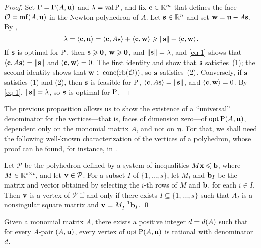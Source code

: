 \documentclass{amsart}
\begin{document}
\begin{proof}
   Set $\mathrm{P} = \mathrm{P}(A, \mathbf{u})$ and $\lambda = \operatorname{val} \mathrm{P} $, and fix $\mathbf{c} \in \mathbb{R}^m$ that defines the face $\mathcal{O} = \operatorname{mf}(A, \mathbf{u})$ in the Newton polyhedron of $A$.
   Let $\mathbf{s} \in \mathbb{R}^n$ and set $\mathbf{w} = \mathbf{u} - A\mathbf{s}$.
   By ,
   \begin{equation}\label{eq 1}
      \lambda = \langle \mathbf{c}, \mathbf{u} \rangle = \langle \mathbf{c}, A \mathbf{s} \rangle + \langle \mathbf{c}, \mathbf{w} \rangle \geqslant \| \mathbf{s} \| + \langle \mathbf{c}, \mathbf{w} \rangle.
   \end{equation}
   If $\mathbf{s}$ is optimal for $\mathrm{P}$, then $\mathbf{s} \geqslant \mathbf{0}$, $\mathbf{w} \geqslant \mathbf{0}$, and $\| \mathbf{s} \| = \lambda$, and \eqref{eq 1} shows that $\langle \mathbf{c}, A \mathbf{s} \rangle = \| \mathbf{s} \|$ and $\langle \mathbf{c}, \mathbf{w} \rangle = 0$.
   The first identity and  show that $\mathbf{s}$ satisfies~(1); the second identity shows that $\mathbf{w}\in \operatorname{cone}(\operatorname{rb}(\mathcal{O}))$, so $\mathbf{s}$ satisfies~(2).
   Conversely, if $\mathbf{s}$ satisfies (1) and (2), then $\mathbf{s}$ is feasible for $\mathrm{P}$, $\langle \mathbf{c}, A \mathbf{s} \rangle = \| \mathbf{s} \|$, and $\langle \mathbf{c}, \mathbf{w} \rangle = 0$.
   By \eqref{eq 1}, $\| \mathbf{s} \| = \lambda$, so $\mathbf{s}$ is optimal for $\mathrm{P}$.
\end{proof}

The previous proposition allows us to show the existence of a ``universal'' denominator for the vertices---that is, faces of dimension zero---of $\operatorname{opt}\mathrm{P}(A,\mathbf{u})$, dependent only on the monomial matrix $A$, and not on $\mathbf{u}$.
For that, we shall need the following well-known characterization of the vertices of a polyhedron, whose proof can be found, for instance, in \cite[Theorem~3.34]{conforti+etal.integer_programming}.

\begin{lemma}
   \label{prop: characterization of vertices}
   Let $\mathcal{P}$ be the polyhedron defined by a system of inequalities $M \mathbf{x} \leqslant \mathbf{b}$, where $M\in \mathbb{R}^{s\times t}$, and let $\mathbf{v} \in \mathcal{P}$.
   For a subset $I$ of $\{1,\ldots,s\}$, let $M_I$ and $\mathbf{b}_I$ be the matrix and vector obtained by selecting the $i$-th rows of $M$ and $\mathbf{b}$, for each $i\in I$.
   Then $\mathbf{v}$ is a vertex of $\mathcal{P}$ if and only if there exists $I \subseteq \{1,\ldots,s\}$ such that $A_I$ is a nonsingular square matrix and $\mathbf{v} = M_I^{-1}\mathbf{b}_I$.
\qed
\end{lemma}

\begin{theorem}
\label{uniform denominators for vertices:  T}
Given a monomial matrix $A$, there exists a positive integer $d = d(A)$ such that for every $A$-pair $(A, \mathbf{u})$, every vertex of $\operatorname{opt} \mathrm{P}(A, \mathbf{u})$ is rational with denominator $d$.
\end{theorem}
\end{document}
